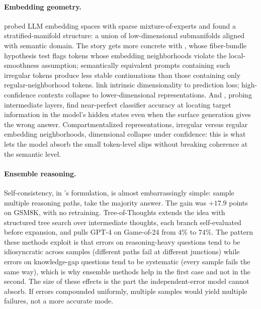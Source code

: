 \paragraph{Embedding geometry.}
\citet{li2025unraveling} probed LLM embedding spaces with sparse mixture-of-experts and found a stratified-manifold structure: a union of low-dimensional submanifolds aligned with semantic domain. The story gets more concrete with \citet{robinson2025token}, whose fiber-bundle hypothesis test flags tokens whose embedding neighborhoods violate the local-smoothness assumption; semantically equivalent prompts containing such irregular tokens produce less stable continuations than those containing only regular-neighborhood tokens. \citet{viswanathan2024geometry} link intrinsic dimensionality to prediction loss; high-confidence contexts collapse to lower-dimensional representations. And \citet{gao2024insights}, probing intermediate layers, find near-perfect classifier accuracy at locating target information in the model's hidden states even when the surface generation gives the wrong answer. Compartmentalized representations, irregular versus regular embedding neighborhoods, dimensional collapse under confidence: this is what lets the model absorb the small token-level slips without breaking coherence at the semantic level.

\paragraph{Ensemble reasoning.}
Self-consistency, in \citet{wang2023self}'s formulation, is almost embarrassingly simple: sample multiple reasoning paths, take the majority answer. The gain was $+17.9$ points on GSM8K, with no retraining. Tree-of-Thoughts \citep{yao2023tree} extends the idea with structured tree search over intermediate thoughts, each branch self-evaluated before expansion, and pulls GPT-4 on Game-of-24 from $4\%$ to $74\%$. The pattern these methods exploit is that errors on reasoning-heavy questions tend to be idiosyncratic across samples (different paths fail at different junctions) while errors on knowledge-gap questions tend to be systematic (every sample fails the same way), which is why ensemble methods help in the first case and not in the second. The size of these effects is the part the independent-error model cannot absorb. If errors compounded uniformly, multiple samples would yield multiple failures, not a more accurate mode.

